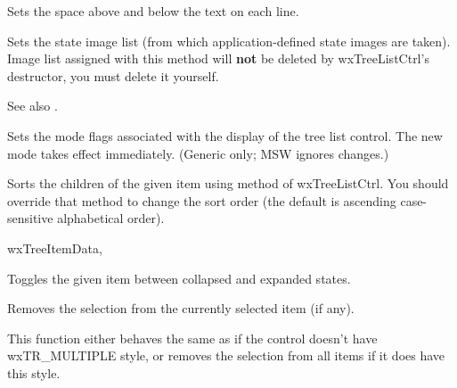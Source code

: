 
Sets the space above and below the text on each line.

\label{wxtreelistctrlsetstateimagelist}


Sets the state image list (from which application-defined state images are taken).
Image list assigned with this method will
{\bf not} be deleted by wxTreeListCtrl's destructor, you must delete it yourself.

See also .


Sets the mode flags associated with the display of the tree list control.
The new mode takes effect immediately.
(Generic only; MSW ignores changes.)

\label{wxtreelistctrlsortchildren}


Sorts the children of the given item using
 method of wxTreeListCtrl. You
should override that method to change the sort order (the default is ascending
case-sensitive alphabetical order).


wxTreeItemData, 

\label{wxtreelistctrltoggle}


Toggles the given item between collapsed and expanded states.

\label{wxtreelistctrlunselect}


Removes the selection from the currently selected item (if any).

\label{wxtreelistctrlunselectall}


This function either behaves the same as 
if the control doesn't have wxTR\_MULTIPLE style, or removes the selection from
all items if it does have this style.

